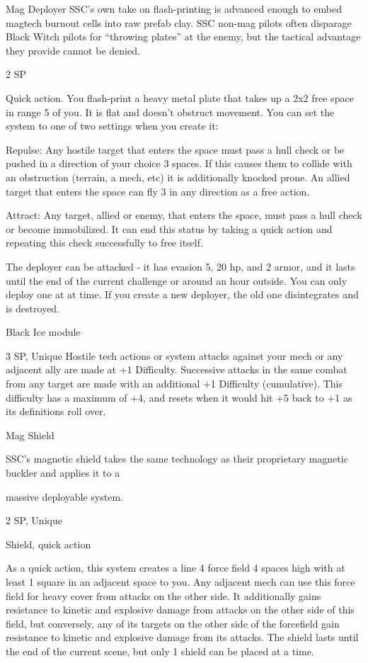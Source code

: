Mag Deployer
SSC’s own take on flash-printing is advanced enough to embed magtech burnout cells into raw
prefab clay. SSC non-mag pilots often disparage Black Witch pilots for “throwing plates” at the
enemy, but the tactical advantage they provide cannot be denied.

2 SP

Quick action.
You flash-print a heavy metal plate that takes up a 2x2 free space in range 5 of you. It is flat and
doesn’t obstruct movement. You can set the system to one of two settings when you create it:

         Repulse: Any hostile target that enters the space must pass a hull check or be pushed in
         a direction of your choice 3 spaces. If this causes them to collide with an obstruction
         (terrain, a mech, etc) it is additionally knocked prone. An allied target that enters the
         space can fly 3 in any direction as a free action.

         Attract: Any target, allied or enemy, that enters the space, must pass a hull check or
         become immobilized. It can end this status by taking a quick action and repeating this
         check successfully to free itself.

The deployer can be attacked - it has evasion 5, 20 hp, and 2 armor, and it lasts until the end of
the current challenge or around an hour outside. You can only deploy one at at time. If you create
a new deployer, the old one disintegrates and is destroyed.


Black Ice module





3 SP, Unique
Hostile tech actions or system attacks against your mech or any adjacent ally are made at +1
Difficulty. Successive attacks in the same combat from any target are made with an additional +1
Difficulty (cumulative). This difficulty has a maximum of +4, and resets when it would hit +5 back
to +1 as its definitions roll over.


Mag Shield

SSC’s magnetic shield takes the same technology as their proprietary magnetic buckler and applies it to a

massive deployable system.

2 SP, Unique

Shield, quick action

As a quick action, this system creates a line 4 force field 4 spaces high with at least 1 square in
an adjacent space to you. Any adjacent mech can use this force field for heavy cover from
attacks on the other side. It additionally gains resistance to kinetic and explosive damage from
attacks on the other side of this field, but conversely, any of its targets on the other side of the
forcefield gain resistance to kinetic and explosive damage from its attacks. The shield lasts until
the end of the current scene, but only 1 shield can be placed at a time.


